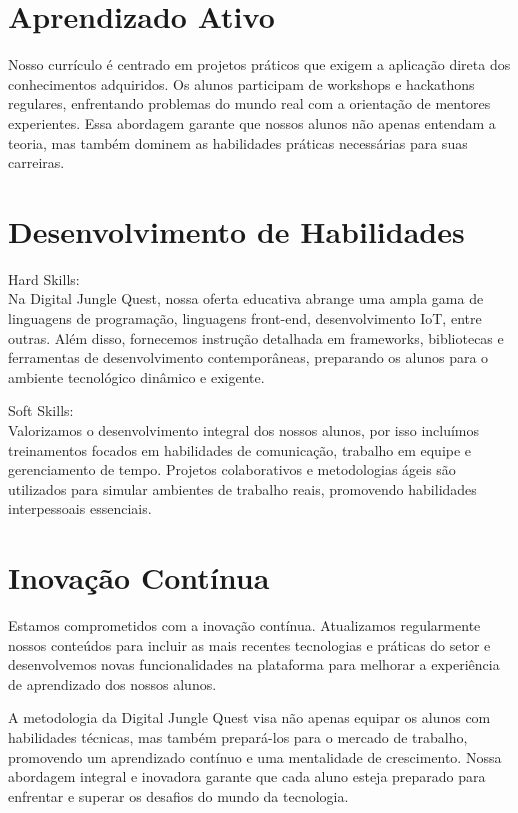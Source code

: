 \section{Aprendizado Ativo}
\label{sec:Aprendizado Ativo}
Nosso currículo é centrado em projetos práticos que exigem a aplicação direta dos conhecimentos adquiridos. Os alunos participam de workshops e hackathons regulares, enfrentando problemas do mundo real com a orientação de mentores experientes. Essa abordagem garante que nossos alunos não apenas entendam a teoria, mas também dominem as habilidades práticas necessárias para suas carreiras.

\section{Desenvolvimento de Habilidades}
\label{sec:Desenvolvimento de Habilidades}

Hard Skills:\\
Na Digital Jungle Quest, nossa oferta educativa abrange uma ampla gama de linguagens de programação, linguagens front-end, desenvolvimento IoT, entre outras. Além disso, fornecemos instrução detalhada em frameworks, bibliotecas e ferramentas de desenvolvimento contemporâneas, preparando os alunos para o ambiente tecnológico dinâmico e exigente.

Soft Skills:\\
Valorizamos o desenvolvimento integral dos nossos alunos, por isso incluímos treinamentos focados em habilidades de comunicação, trabalho em equipe e gerenciamento de tempo. Projetos colaborativos e metodologias ágeis são utilizados para simular ambientes de trabalho reais, promovendo habilidades interpessoais essenciais.

\section{Inovação Contínua}
\label{sec:Inovação Contínua}
Estamos comprometidos com a inovação contínua. Atualizamos regularmente nossos conteúdos para incluir as mais recentes tecnologias e práticas do setor e desenvolvemos novas funcionalidades na plataforma para melhorar a experiência de aprendizado dos nossos alunos.

A metodologia da Digital Jungle Quest visa não apenas equipar os alunos com habilidades técnicas, mas também prepará-los para o mercado de trabalho, promovendo um aprendizado contínuo e uma mentalidade de crescimento. Nossa abordagem integral e inovadora garante que cada aluno esteja preparado para enfrentar e superar os desafios do mundo da tecnologia.

